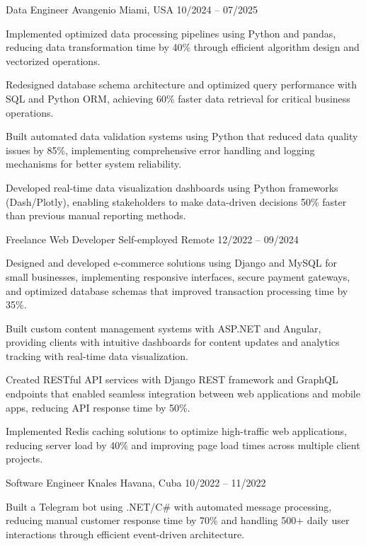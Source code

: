 \documentclass[]{awesome-cv}
\begin{document}
\begin{cventries}
	\cventry
	{Data Engineer}
	{Avangenio}
	{Miami, USA}
	{10/2024 – 07/2025}
	{\begin{cvitems}
			\vspace{0.5mm}
			\item {Implemented optimized data processing pipelines using Python and pandas, reducing data transformation time by 40\% through efficient algorithm design and vectorized operations.}
			\item {Redesigned database schema architecture and optimized query performance with SQL and Python ORM, achieving 60\% faster data retrieval for critical business operations.}
			\item {Built automated data validation systems using Python that reduced data quality issues by 85\%, implementing comprehensive error handling and logging mechanisms for better system reliability.}
			\item {Developed real-time data visualization dashboards using Python frameworks (Dash/Plotly), enabling stakeholders to make data-driven decisions 50\% faster than previous manual reporting methods.}
		\end{cvitems}}

	\cventry
	{Freelance Web Developer}
	{Self-employed}
	{Remote}
	{12/2022 – 09/2024}
	{\begin{cvitems}
			\vspace{0.5mm}
			\item {Designed and developed e-commerce solutions using Django and MySQL for small businesses, implementing responsive interfaces, secure payment gateways, and optimized database schemas that improved transaction processing time by 35\%.}
			\item {Built custom content management systems with ASP.NET and Angular, providing clients with intuitive dashboards for content updates and analytics tracking with real-time data visualization.}
			\item {Created RESTful API services with Django REST framework and GraphQL endpoints that enabled seamless integration between web applications and mobile apps, reducing API response time by 50\%.}
			\item {Implemented Redis caching solutions to optimize high-traffic web applications, reducing server load by 40\% and improving page load times across multiple client projects.}
		\end{cvitems}}

	\cventry
	{Software Engineer}
	{Knales}
	{Havana, Cuba}
	{10/2022 – 11/2022}
	{\begin{cvitems}
			\vspace{0.5mm}
			\item {Built a Telegram bot using .NET/C\# with automated message processing, reducing manual customer response time by 70\% and handling 500+ daily user interactions through efficient event-driven architecture.}
		\end{cvitems}}
\end{cventries}
\end{document}
